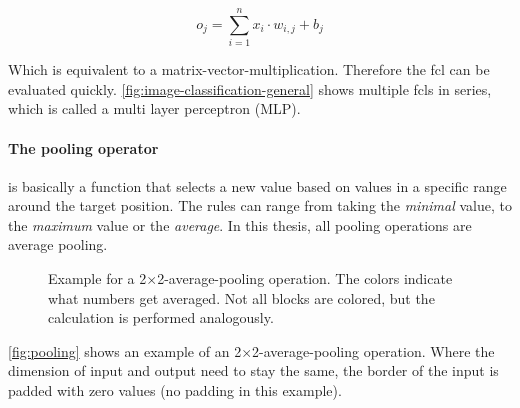 \begin{equation}
    \label{eq:fcl} 
    o_j = \sum\limits_{i=1}^{n} x_i\cdot w_{i, j} + b_j
\end{equation}

Which is equivalent to a matrix-vector-multiplication. Therefore the fcl can be evaluated quickly.
\autoref{fig:image-classification-general} shows multiple fcls in series, which is called a multi layer perceptron (MLP). 

\paragraph{The pooling operator} is basically a function that selects a new value based on values in a specific range around the target position.
The rules can range from taking the \emph{minimal} value, to the \emph{maximum} value or the \emph{average}.
In this thesis, all pooling operations are average pooling.
\begin{figure}[htbp]
    \centering
    \vspace{-0.2cm}
    \caption{
        Example for a 2$\times$2-average-pooling operation. The colors indicate what numbers get averaged. 
        Not all blocks are colored, but the calculation is performed analogously.
    }
    \label{fig:pooling}
\end{figure}
\autoref{fig:pooling} shows an example of an 2$\times$2-average-pooling operation.
Where the dimension of input and output need to stay the same, the border of the input is padded with zero values (no padding in this example).